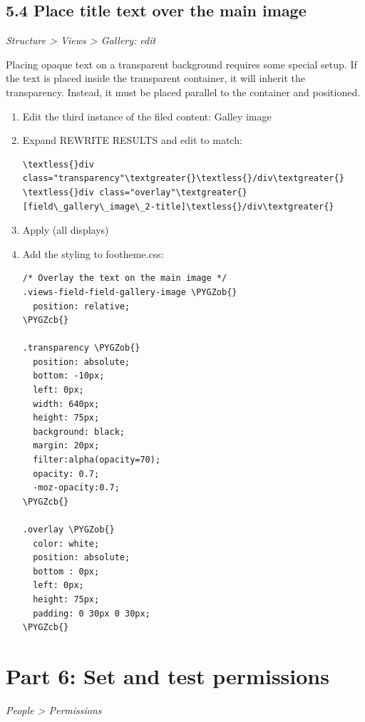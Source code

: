 \documentclass[letterpaper,10pt,english]{sphinxmanual}
\def\PYGZob{\char`\{}
\def\PYGZcb{\char`\}}
\begin{document}
\subsection{5.4 Place title text over the main image}
\label{slides:place-title-text-over-the-main-image}
\emph{Structure \textgreater{} Views \textgreater{} Gallery: edit}

Placing opaque text on a transparent background requires some special setup. If the text is placed inside the transparent container, it will inherit the transparency. Instead, it must be placed parallel to the container and positioned.
\begin{enumerate}
\item {} 
Edit the third instance of the filed content: Galley image

\item {} 
Expand REWRITE RESULTS and edit to match:

\begin{Verbatim}[commandchars=\\\{\}]
\textless{}div class="transparency"\textgreater{}\textless{}/div\textgreater{}
\textless{}div class="overlay"\textgreater{}[field\_gallery\_image\_2-title]\textless{}/div\textgreater{}
\end{Verbatim}

\item {} 
Apply (all displays)

\item {} 
Add the styling to footheme.css:

\begin{Verbatim}[commandchars=\\\{\}]
/* Overlay the text on the main image */
.views-field-field-gallery-image \PYGZob{}
  position: relative;
\PYGZcb{}

.transparency \PYGZob{}
  position: absolute;
  bottom: -10px;
  left: 0px;
  width: 640px;
  height: 75px;
  background: black;
  margin: 20px;
  filter:alpha(opacity=70);
  opacity: 0.7;
  -moz-opacity:0.7;
\PYGZcb{}

.overlay \PYGZob{}
  color: white;
  position: absolute;
  bottom : 0px;
  left: 0px;
  height: 75px;
  padding: 0 30px 0 30px;
\PYGZcb{}
\end{Verbatim}

\end{enumerate}


\section{Part 6: Set and test permissions}
\label{slides:part-6-set-and-test-permissions}
\emph{People \textgreater{} Permissions}
\end{document}
